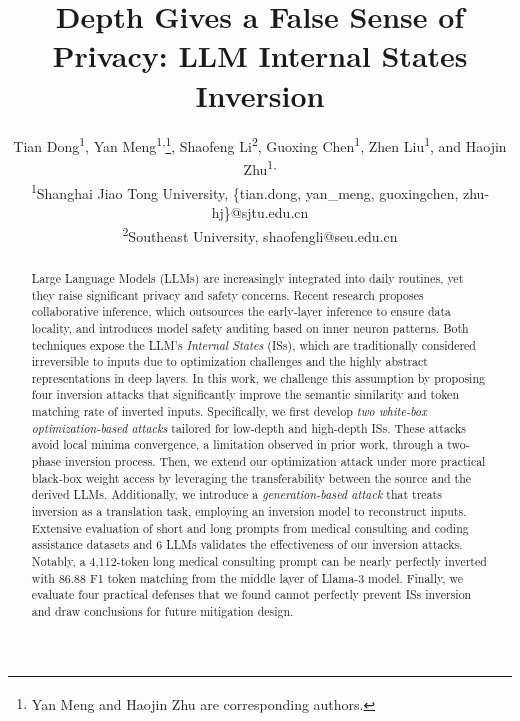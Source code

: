 \documentclass[letterpaper,twocolumn,10pt]{article}
\newcommand{\llama}{Llama}
\theoremstyle{definition}
\begin{document}
\title{Depth Gives a False Sense of Privacy: LLM Internal States Inversion}


\author{
{\rm Tian Dong\textsuperscript{1}, Yan Meng\textsuperscript{1,\Letter}\thanks{\textsuperscript{\Letter}Yan Meng and Haojin Zhu are corresponding authors.}, Shaofeng Li\textsuperscript{2}, Guoxing Chen\textsuperscript{1}, Zhen Liu\textsuperscript{1}, and Haojin Zhu\textsuperscript{1,\Letter}}\\
{\textsuperscript{1}Shanghai Jiao Tong University, \{tian.dong, yan\_meng, guoxingchen, zhu-hj\}@sjtu.edu.cn}\\
{\textsuperscript{2}Southeast University, shaofengli@seu.edu.cn}
}


\maketitle

\begin{abstract}
Large Language Models (LLMs) are increasingly integrated into daily routines, yet they raise significant privacy and safety concerns.
Recent research proposes collaborative inference, which outsources the early-layer inference to ensure data locality, and introduces model safety auditing based on inner neuron patterns.
Both techniques expose the LLM's \textit{Internal States} (ISs), which are traditionally considered irreversible to inputs due to optimization challenges and the highly abstract representations in deep layers.
In this work, we challenge this assumption by proposing four inversion attacks that significantly improve the semantic similarity and token matching rate of inverted inputs. Specifically, we first develop \textit{two white-box optimization-based attacks} tailored for low-depth and high-depth ISs. These attacks avoid local minima convergence, a limitation observed in prior work, through a two-phase inversion process.
Then, we extend our optimization attack under more practical black-box weight access by leveraging the transferability between the source and the derived LLMs.
Additionally, we introduce a \textit{generation-based attack} that treats inversion as a translation task, employing an inversion model to reconstruct inputs.
Extensive evaluation of short and long prompts from medical consulting and coding assistance datasets and 6 LLMs validates the effectiveness of our inversion attacks.
Notably, a 4,112-token long medical consulting prompt can be nearly perfectly inverted with 86.88 F1 token matching from the middle layer of \llama-3 model.
Finally, we evaluate four practical defenses that we found cannot perfectly prevent ISs inversion and draw conclusions for future mitigation design.

\end{abstract}
\end{document}
